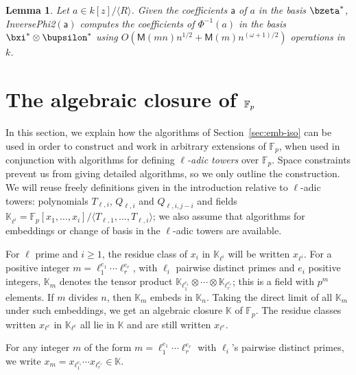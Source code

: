 \documentclass{sig-alternate}
\def\M {\ensuremath{\mathsf{M}}}
\def\F {\ensuremath{\mathbb{F}}}
\def\K {\ensuremath{\mathbb{K}}}
\def\va {\ensuremath{\mathsf{a}}}
\newcounter{algo}
\newcommand{\ang}[1]{\langle#1\rangle}
\newtheorem{Lemma}{Lemma}
\begin{document}
\begin{Lemma}\label{lemma:tiso2}
  Let $a\in k[z]/\ang{R}$. Given the coefficients $\va$ of $a$ in the
  basis $\bzeta^\ast$, {\sf InversePhi2}$(\va)$ computes the
  coefficients of $\Phi^{-1}(a)$ in the basis $\bxi^\ast \otimes
  \bupsilon^\ast$ using $O(\M(mn)n^{1/2}+\M(m) n^{(\omega+1)/2} )$
  operations in~$k$.
\end{Lemma}


\section{The algebraic closure of $\large\F_p$}\label{sec:fpbar}

In this section, we explain how the algorithms of
Section~\ref{sec:emb-iso} can be used in order to construct and work
in arbitrary extensions of $\F_p$, when used in conjunction with
algorithms for defining {\em $\ell$-adic towers} over $\F_p$. Space
constraints prevent us from giving detailed algorithms, so we only
outline the construction. We will reuse freely definitions given in
the introduction relative to $\ell$-adic towers: polynomials
$T_{\ell,i}$, $Q_{\ell,i}$ and $Q_{\ell,i,j-i}$ and fields
$\K_{\ell^i}=\F_p[x_1,\dots,x_i]/\langle
T_{\ell,1},\dots,T_{\ell,i}\rangle$; we also assume that algorithms
for embeddings or change of basis in the $\ell$-adic towers are
available.

\smallskip{} For $\ell$ prime and $i \ge 1$,
the residue class of $x_i$ in $\K_{\ell^i}$ will be written
$x_{\ell^i}$. For a positive integer $m=\ell_1^{e_1}\cdots
\ell_r^{e_r}$, with $\ell_i$ pairwise distinct primes and $e_i$
positive integers, $\K_m$ denotes the tensor product
$\K_{\ell_1^{e_1}} \otimes \cdots \otimes \K_{\ell_r^{e_r}}$; this is
a field with $p^m$ elements.  If $m$ divides $n$, then $\K_m$ embeds
in $\K_n$. Taking the direct limit of all $\K_m$ under such
embeddings, we get an algebraic closure $\K$ of $\F_p$. The residue
classes written $x_{\ell^e}$ in $\K_{\ell^e}$ all lie in $\K$ and are
still written $x_{\ell^e}$.

For any integer $m$ of the form $m=\ell_1^{e_1}\cdots \ell_r^{e_r}$
with $\ell_i$'s pairwise distinct primes, we write $x_m =
x_{\ell_1^{e_1}} \cdots x_{\ell_r^{e_r}} \in \K$.
\end{document}
